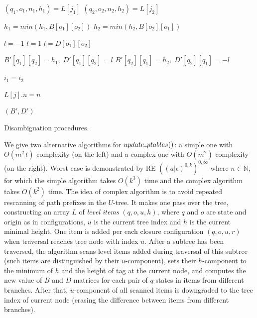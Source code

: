 \documentclass[AMA,STIX1COL]{WileyNJD-v2}
\newcommand{\Xund}{\rule{.4em}{.4pt}}
\newcommand{\YN}{\mathbb{N}}
\begin{document}
\begin{algorithm}[H]
\begin{multicols}{2}
{{{{                    \BlankLine
                     {
                        $(q_1, o_1, n_1, h_1) = L[j_1]$ \;
                        $(q_2, o_2, n_2, h_2) = L[j_2]$ \;

                        \BlankLine
                         {
                            $h_1 = min(h_1, B[o_1][o_2])$ \;
                            $h_2 = min(h_2, B[o_2][o_1])$ \;
                        }

                        \BlankLine
                            {$l = -1$}
                            {$l = 1$ }
                         {$l = D[o_1][o_2]$}
                    }

                    \BlankLine
                    $B'[q_1][q_2] = h_1, \; D'[q_1][q_2] = l$ \;
                    $B'[q_2][q_1] = h_2, \; D'[q_2][q_1] = -l$ \;
                }

                $i_1 = i_2$ \;
            }

            \BlankLine
             {
                $L[j].n = n$
            }
        }

        \BlankLine
        \Return $(B', D')$ \;
    }

\end{multicols}
\caption{Disambiguation procedures.}
\end{algorithm}
\medskip

We give two alternative algorithms for $update \Xund ptables ()$:
a simple one with $O(m^2 \, t)$ complexity (on the left) and a complex one with $O(m^2)$ complexity (on the right).
Worst case is demonstrated by RE $((a|\epsilon)^{0,k})^{0,\infty}$ where $n \in \YN$,
for which the simple algorithm takes $O(k^3)$ time and the complex algorithm takes $O(k^2)$ time.
%
The idea of complex algorithm is to avoid repeated rescanning of path prefixes in the $U$-tree.
It makes one pass over the tree,
constructing an array $L$ of \emph{level items} $(q, o, u, h)$, where
$q$ and $o$ are state and origin as in configurations,
$u$ is the current tree index and $h$ is the current minimal height.
One item is added per each closure configuration $(q, o, u, r)$ when traversal reaches tree node with index $u$.
After a subtree has been traversed,
the algorithm scans level items added during traversal of this subtree (such items are distinguished by their $u$-component),
sets their $h$-component to the minimum of $h$ and the height of tag at the current node,
and computes the new value of $B$ and $D$ matrices for each pair of $q$-states in items from different branches.
After that, $u$-component of all scanned items is downgraded to the tree index of current node
(erasing the difference between items from different branches).
\end{document}
